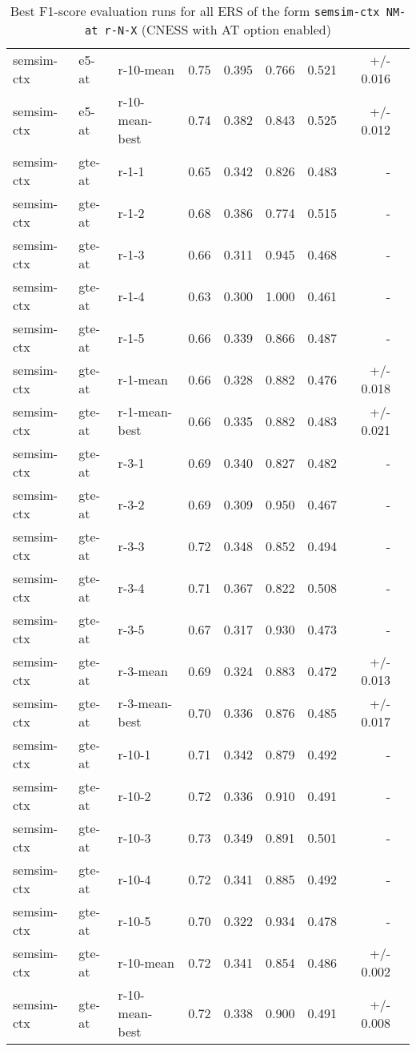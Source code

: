 \begin{table}[H]
\begin{tabular}{lllrrrrrr}
semsim-ctx & e5-at & r-10-mean & 0.75 & 0.395 & 0.766 & 0.521 & +/- 0.016 \\
semsim-ctx & e5-at & r-10-mean-best & 0.74 & 0.382 & 0.843 & 0.525 & +/- 0.012 \\
\hline
semsim-ctx & gte-at & r-1-1 & 0.65 & 0.342 & 0.826 & 0.483 & - \\
semsim-ctx & gte-at & r-1-2 & 0.68 & 0.386 & 0.774 & 0.515 & - \\
semsim-ctx & gte-at & r-1-3 & 0.66 & 0.311 & 0.945 & 0.468 & - \\
semsim-ctx & gte-at & r-1-4 & 0.63 & 0.300 & 1.000 & 0.461 & - \\
semsim-ctx & gte-at & r-1-5 & 0.66 & 0.339 & 0.866 & 0.487 & - \\
semsim-ctx & gte-at & r-1-mean & 0.66 & 0.328 & 0.882 & 0.476 & +/- 0.018 \\
semsim-ctx & gte-at & r-1-mean-best & 0.66 & 0.335 & 0.882 & 0.483 & +/- 0.021 \\
\hline
semsim-ctx & gte-at & r-3-1 & 0.69 & 0.340 & 0.827 & 0.482 & - \\
semsim-ctx & gte-at & r-3-2 & 0.69 & 0.309 & 0.950 & 0.467 & - \\
semsim-ctx & gte-at & r-3-3 & 0.72 & 0.348 & 0.852 & 0.494 & - \\
semsim-ctx & gte-at & r-3-4 & 0.71 & 0.367 & 0.822 & 0.508 & - \\
semsim-ctx & gte-at & r-3-5 & 0.67 & 0.317 & 0.930 & 0.473 & - \\
semsim-ctx & gte-at & r-3-mean & 0.69 & 0.324 & 0.883 & 0.472 & +/- 0.013 \\
semsim-ctx & gte-at & r-3-mean-best & 0.70 & 0.336 & 0.876 & 0.485 & +/- 0.017 \\
\hline
semsim-ctx & gte-at & r-10-1 & 0.71 & 0.342 & 0.879 & 0.492 & - \\
semsim-ctx & gte-at & r-10-2 & 0.72 & 0.336 & 0.910 & 0.491 & - \\
semsim-ctx & gte-at & r-10-3 & 0.73 & 0.349 & 0.891 & 0.501 & - \\
semsim-ctx & gte-at & r-10-4 & 0.72 & 0.341 & 0.885 & 0.492 & - \\
semsim-ctx & gte-at & r-10-5 & 0.70 & 0.322 & 0.934 & 0.478 & - \\
semsim-ctx & gte-at & r-10-mean & 0.72 & 0.341 & 0.854 & 0.486 & +/- 0.002 \\
semsim-ctx & gte-at & r-10-mean-best & 0.72 & 0.338 & 0.900 & 0.491 & +/- 0.008 \\\bottomrule
\end{tabular}
\caption{Best F1-score evaluation runs for all ERS of the form \texttt{semsim-ctx NM-at r-N-X} (CNESS with AT option enabled)}
\label{tab:best-f1-score-mean-best-semsim-ctx-at}
\end{table}

